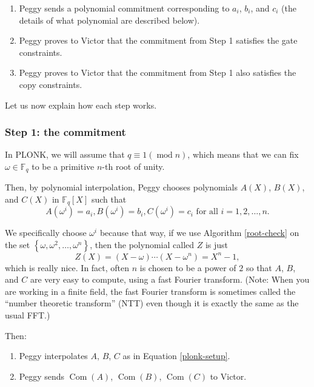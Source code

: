 \begin{enumerate}
\item
  Peggy sends a polynomial commitment corresponding to \(a_{i}\),
  \(b_{i}\), and \(c_{i}\) (the details of what polynomial are described
  below).
\item
  Peggy proves to Victor that the commitment from Step 1 satisfies the
  gate constraints.
\item
  Peggy proves to Victor that the commitment from Step 1 also satisfies
  the copy constraints.
\end{enumerate}

Let us now explain how each step works.

\subsubsection{Step 1: the commitment}

In PLONK, we will assume that \(q \equiv 1 (\operatorname{mod}n)\), which
means that we can fix \(\omega \in {\mathbb{F}}_{q}\) to be a primitive
\(n\)-th root of unity.

Then, by polynomial interpolation, Peggy chooses polynomials \(A(X)\),
\(B(X)\), and \(C(X)\) in \({\mathbb{F}}_{q}[ X]\) such that
\begin{equation}
\label{plonk-setup}
A\left( \omega^{i} \right) = a_{i},B\left( \omega^{i} \right) = b_{i},C\left( \omega^{i} \right) = c_{i}\text{  for all  }i = 1,2,\ldots,n.
\end{equation}

We specifically choose \(\omega^{i}\) because that way, if we use
Algorithm \ref{root-check} on the set
\(\left\{ \omega,\omega^{2},\ldots,\omega^{n} \right\}\), then the
polynomial called \(Z\) is just
\[Z(X) = (X - \omega)\cdots\left( X - \omega^{n} \right) = X^{n} - 1,\]
which is really nice. In fact, often \(n\) is chosen to be a power of
\(2\) so that \(A\), \(B\), and \(C\) are very easy to compute, using a
fast Fourier transform. (Note: When you are working in a finite field,
the fast Fourier transform is sometimes called the ``number theoretic
transform'' (NTT) even though it is exactly the same as the usual FFT.)

Then:

\begin{algo}
\leavevmode
\begin{enumerate}
\item
  Peggy interpolates \(A\), \(B\), \(C\) as in
  Equation \eqref{plonk-setup}.
\item
  Peggy sends \(\operatorname{Com}(A)\), \(\operatorname{Com}(B)\),
  \(\operatorname{Com}(C)\) to Victor.
\end{enumerate}
\end{algo}

